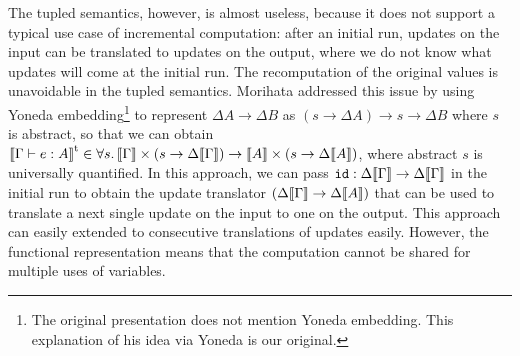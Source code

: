 \documentclass{article}
\theoremstyle{definition}
\begin{document}
The tupled semantics, however, is almost useless, because it does not support a typical use case of incremental computation: 
after an initial run, updates on the input can be translated to updates on the output, where we do not know what updates will come at
the initial run. 
The recomputation of the original values is unavoidable in the tupled semantics.
Morihata  addressed this issue by using Yoneda embedding\footnote{The original presentation does not mention Yoneda embedding. This explanation of his idea via Yoneda is our original.} to represent $\Delta A \to \Delta B$ as $(s \to \Delta A) \to s \to \Delta B$ where $s$ is abstract, 
so that we can obtain $\sem{ \Gamma \vdash e : A }^\mathrm{t} \in \forall s.\, \sem{\Gamma} \x (s \to \Delta \sem{\Gamma}) \to \sem{A} \x (s \to \Delta \sem{A})$, where abstract $s$ is universally quantified. 
In this approach, we can pass $\var{id} : \Delta \sem{\Gamma} \to \Delta \sem{\Gamma}$ in the initial run to obtain the update translator $(\Delta \sem{\Gamma} \to \Delta \sem{A})$ that can be 
used to translate a next single update on the input to one on the output. This approach can easily extended to consecutive translations of updates easily.
However, the functional representation means that the computation cannot be shared for multiple uses of variables. 
\end{document}
